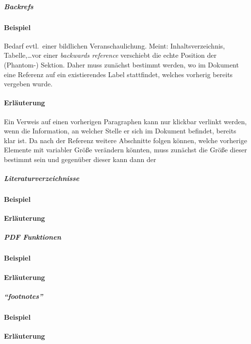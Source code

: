 \subparagraph{Backrefs}
\paragraph*{Beispiel}
Bedarf evtl.\ einer bildlichen Veranschaulichung. Meint: Inhaltsverzeichnis, Tabelle,\ldots vor einer \textit{backwards reference} verschiebt die echte Position der (Phantom-) Sektion. Daher muss zunächst bestimmt werden, wo im Dokument eine Referenz auf ein existierendes Label stattfindet, welches vorherig bereits vergeben wurde.
\paragraph*{Erläuterung}
Ein Verweis auf einen vorherigen Paragraphen kann nur klickbar verlinkt werden, wenn die Information, an welcher Stelle er sich im Dokument befindet, bereits klar ist. Da nach der Referenz weitere Abschnitte folgen können, welche vorherige Elemente mit variabler Größe verändern könnten, muss zunächst die Größe dieser bestimmt sein und gegenüber dieser kann dann der 

\subparagraph*{Literaturverzeichnisse}
\paragraph*{Beispiel}
\paragraph*{Erläuterung}

\subparagraph*{PDF Funktionen}
\paragraph*{Beispiel}
\paragraph*{Erläuterung}

\subparagraph*{\enquote{footnotes}}
\paragraph*{Beispiel}
\paragraph*{Erläuterung}






